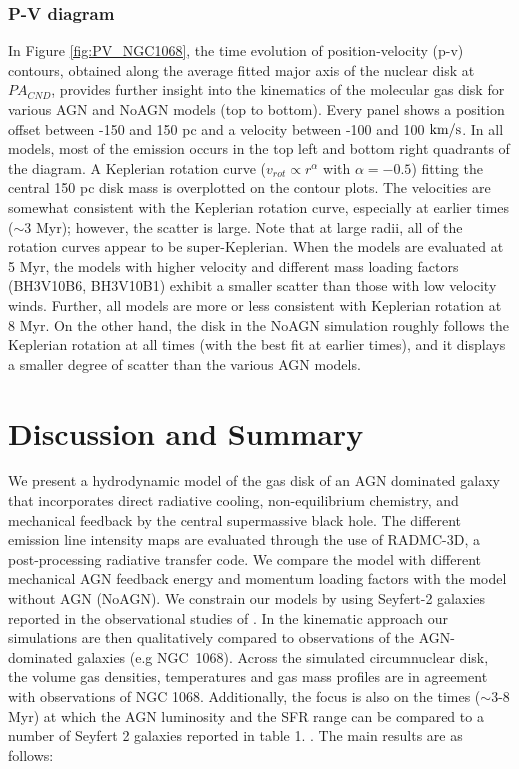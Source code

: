 \documentclass[fleqn,usenatbib]{mnras}
\begin{document}
\subsubsection{P-V diagram}
In Figure \ref{fig:PV_NGC1068}, the time evolution of position-velocity (p-v) contours, obtained along the average fitted major axis of the nuclear disk at $PA_{CND}$, provides further insight into the kinematics of the molecular gas disk for various AGN and NoAGN models (top to bottom). Every panel shows a position offset between -150 and 150 pc and a velocity between -100 and 100 $\rm km/s$. 
In all models, most of the emission occurs in the top left and bottom right quadrants of the diagram. A Keplerian rotation curve ($v_{rot}\propto r^{\alpha}$ with $\alpha = -0.5$) fitting the central 150 pc disk mass is overplotted on the contour plots. 
The velocities are somewhat consistent with the Keplerian rotation curve, especially at earlier times ($\sim$3 Myr); however, the scatter is large. Note that at large radii, all of the rotation curves appear to be super-Keplerian.
When the models are evaluated at 5 Myr, the models with higher velocity and different mass loading factors (BH3V10B6, BH3V10B1) exhibit a smaller scatter than those with low velocity winds.  Further, all models are more or less consistent with Keplerian rotation at 8 Myr. On the other hand, the disk in the NoAGN simulation roughly follows the Keplerian rotation at all times (with the best fit at earlier times), and it displays a smaller degree of scatter than the various AGN models. 


\section{Discussion and Summary}
\label{subsec:sum}
We present a hydrodynamic model of the gas disk of an AGN dominated galaxy that incorporates direct radiative cooling, non-equilibrium chemistry, and mechanical feedback by the central supermassive black hole. The different emission line intensity maps are evaluated through the use of RADMC-3D, a post-processing radiative transfer code. We compare the model with different mechanical AGN feedback energy and momentum loading factors with the model without AGN (NoAGN). We constrain our models by using Seyfert-2 galaxies reported in the observational studies of \citet{Combes2019}. In the kinematic approach our simulations are then qualitatively compared to observations of the AGN-dominated galaxies (e.g NGC~1068). Across the simulated circumnuclear disk, the volume gas densities, temperatures and gas mass profiles are in agreement with observations of  NGC 1068. Additionally, the focus is also on the times ($\sim$3-8 Myr) at which the AGN luminosity and the SFR range can be compared to a number of Seyfert 2 galaxies reported in table 1. \citet{Combes2019}.
 The main results are as follows:
 
\end{document}

